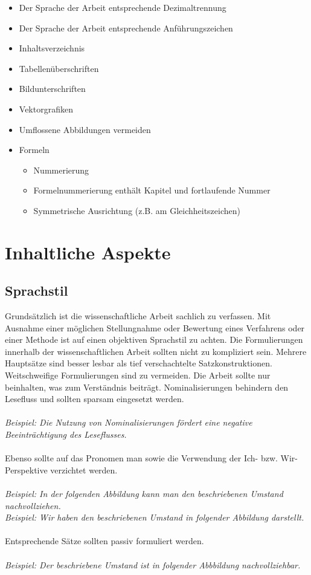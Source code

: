 \begin{itemize}
	\item Der Sprache der Arbeit entsprechende Dezimaltrennung
	\item Der Sprache der Arbeit entsprechende Anführungszeichen
	\item Inhaltsverzeichnis
	\item Tabellenüberschriften
	\item Bildunterschriften
	\item Vektorgrafiken
	\item Umflossene Abbildungen vermeiden
	\item Formeln
	\begin{itemize}
		\item Nummerierung
		\item Formelnummerierung enthält Kapitel und fortlaufende Nummer
		\item Symmetrische Ausrichtung (z.B. am Gleichheitszeichen)
	\end{itemize}
\end{itemize}

\section{Inhaltliche Aspekte}\label{sec:Inhaltliches}

\subsection{Sprachstil}
Grundsätzlich ist die wissenschaftliche Arbeit sachlich zu verfassen. Mit Ausnahme einer möglichen Stellungnahme oder Bewertung eines Verfahrens oder einer Methode ist auf einen objektiven Sprachstil zu achten. Die Formulierungen innerhalb der wissenschaftlichen Arbeit sollten nicht zu kompliziert sein. Mehrere Hauptsätze sind besser lesbar als tief verschachtelte Satzkonstruktionen. Weitschweifige Formulierungen sind zu vermeiden. Die Arbeit sollte nur beinhalten, was zum Verständnis beiträgt. Nominalisierungen behindern den Lesefluss und sollten sparsam eingesetzt werden.
\\ \\
\textit{Beispiel: 	\glqq Die Nutzung von Nominalisierungen fördert eine negative Beeinträchtigung des Leseflusses. \grqq{}}
\\ \\
Ebenso sollte auf das Pronomen 	\glqq man\grqq{} sowie die Verwendung der Ich- bzw. Wir-Perspektive verzichtet werden.
\\ \\
\textit{Beispiel: 	\glqq In der folgenden Abbildung kann man den beschriebenen Umstand nachvollziehen. \grqq{}}
\\
\textit{Beispiel: 	\glqq Wir haben den beschriebenen Umstand in folgender Abbildung darstellt. \grqq{}}
\\ \\
Entsprechende Sätze sollten passiv formuliert werden.
\\ \\
\textit{Beispiel: 	\glqq Der beschriebene Umstand ist in folgender Abbbildung nachvollziehbar. \grqq{}}

